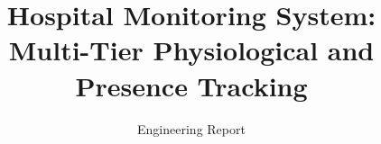 \documentclass[12pt, a4paper]{report}
\begin{document}

\title{Hospital Monitoring System: Multi-Tier Physiological and Presence Tracking}
\author{Engineering Report}



\setcounter{secnumdepth}{3}
\setcounter{tocdepth}{2}
\tableofcontents

\listoffigures
\listoftables


\clearpage
{}














\end{document}
